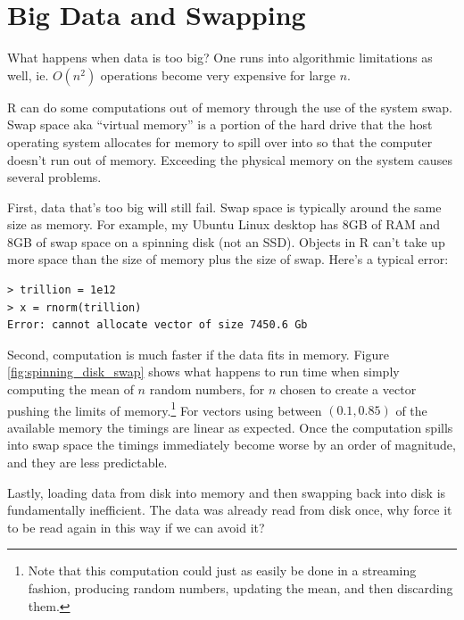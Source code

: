 \documentclass[12pt]{article}
\begin{document}
\section{Big Data and Swapping}

What happens when data is too big? One runs into algorithmic limitations as
well, ie. $O(n^2)$ operations become very expensive for large $n$.

R can do some computations out of memory through the use of the system
swap. Swap space aka ``virtual memory'' is a portion of the hard drive that
the host operating system allocates for memory to spill over into so that
the computer doesn't run out of memory.  Exceeding the physical memory on
the system causes several problems.

First, data that's too big will still fail. Swap space is typically
around the same size as memory. For example, my Ubuntu Linux desktop has
8GB of RAM and 8GB of swap space on a spinning disk (not an SSD). Objects
in R can't take up more space than the size of memory plus the size of
swap. Here's a typical error:

\begin{verbatim}
> trillion = 1e12
> x = rnorm(trillion)
Error: cannot allocate vector of size 7450.6 Gb
\end{verbatim}

Second, computation is much faster if the data fits in memory.
Figure \ref{fig:spinning_disk_swap} shows what happens to run time when
simply computing the mean of $n$ random numbers, for $n$ chosen to create a
vector pushing the limits of memory.\footnote{Note that this computation
could just as easily be done in a streaming fashion, producing random
numbers, updating the mean, and then discarding them.} For vectors using between $(0.1, 0.85)$
of the available memory the timings are linear as expected.
Once the computation spills into swap space the timings immediately become
worse by an order of magnitude, and they are less predictable.

Lastly, loading data from disk into memory and then swapping back into disk
is fundamentally inefficient. The data was already read from disk once, why force it
to be read again in this way if we can avoid it?
\end{document}
